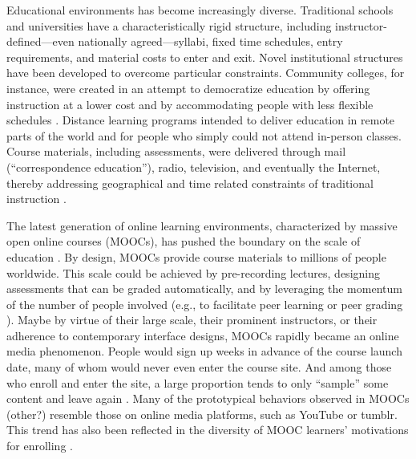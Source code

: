 \documentclass{sigchi}\usepackage[]{graphicx}\usepackage[]{color}
\begin{document}
Educational environments has become increasingly diverse. Traditional schools and universities have a characteristically rigid structure, including instructor-defined---even nationally agreed---syllabi, fixed time schedules, entry requirements, and material costs to enter and exit. Novel institutional structures have been developed to overcome particular constraints. Community colleges, for instance, were created in an attempt to democratize education by offering instruction at a lower cost and by accommodating people with less flexible schedules \cite{goldrick2010challenges}. Distance learning programs intended to deliver education in remote parts of the world and for people who simply could not attend in-person classes. Course materials, including assessments, were delivered through mail (``correspondence education''), radio, television, and eventually the Internet, thereby addressing geographical and time related constraints of traditional instruction \cite{moore1996distance}.

The latest generation of online learning environments, characterized by massive open online courses (MOOCs), has pushed the boundary on the scale of education \cite{waldrop2013campus}. By design, MOOCs provide course materials to millions of people worldwide. This scale could be achieved by pre-recording lectures, designing assessments that can be graded automatically, and by leveraging the momentum of the number of people involved (e.g., to facilitate peer learning or peer grading \cite{kulkarni2013peer,cambre2014talkabout}). Maybe by virtue of their large scale, their prominent instructors, or their adherence to contemporary interface designs, MOOCs rapidly became an online media phenomenon. People would sign up weeks in advance of the course launch date, many of whom would never even enter the course site. And among those who enroll and enter the site, a large proportion tends to only ``sample'' some content and leave again \cite{kizilcec2013deconstructing}. Many of the prototypical behaviors observed in MOOCs \cite{kizilcec2013deconstructing,breslow2013studying} (other?) resemble those on online media platforms, such as YouTube or tumblr. This trend has also been reflected in the diversity of MOOC learners' motivations for enrolling \cite{kizilcec2015motivation}.
\end{document}
